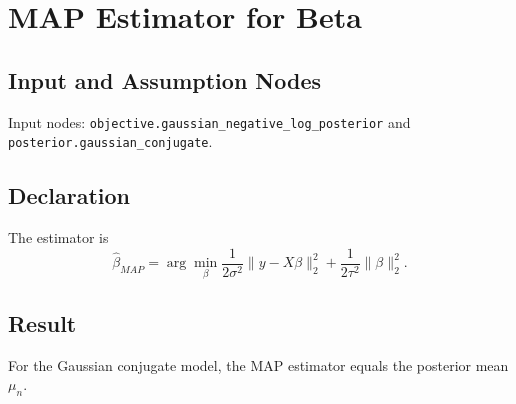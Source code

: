 \section{MAP Estimator for Beta}
\label{estimator:beta-map}

\subsection{Input and Assumption Nodes}
Input nodes: \texttt{objective.gaussian\_negative\_log\_posterior} and \texttt{posterior.gaussian\_conjugate}.

\subsection{Declaration}
The estimator is
\[
  \hat{\beta}_{MAP}
  =
  \arg\min_\beta
  \frac{1}{2\sigma^2}\|y-X\beta\|_2^2
  +
  \frac{1}{2\tau^2}\|\beta\|_2^2.
\]

\subsection{Result}
For the Gaussian conjugate model, the MAP estimator equals the posterior mean \(\mu_n\).

